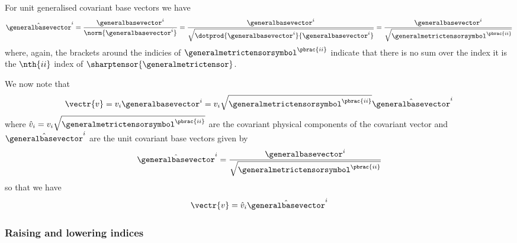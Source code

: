 For unit generalised covariant base vectors we have
\begin{equation}
  \hat{\generalbasevector}^{i}=\dfrac{\generalbasevector^{i}}{\norm{\generalbasevector^{i}}}=\dfrac{\generalbasevector^{i}}{\sqrt{\dotprod{\generalbasevector^{i}}{\generalbasevector^{i}}}}=\dfrac{\generalbasevector^{i}}{\sqrt{\generalmetrictensorsymbol^{\pbrac{ii}}}}
\end{equation}
where, again, the brackets around the indicies of $\generalmetrictensorsymbol^{\pbrac{ii}}$ indicate that there is no sum over the index \ie it is the $\nth{ii}$ index of $\sharptensor{\generalmetrictensor}$.

We now note that
\begin{equation}
  \vectr{v}=v_{i}\generalbasevector^{i}=v_{i}\sqrt{\generalmetrictensorsymbol^{\pbrac{ii}}}\hat{\generalbasevector}^{i}
\end{equation}
where
$\hat{v}_{i}=v_{i}\sqrt{\generalmetrictensorsymbol^{\pbrac{ii}}}$ are
the covariant physical components of the covariant vector and
$\hat{\generalbasevector}^{i}$ are the unit covariant base vectors
given by
\begin{equation}
  \hat{\generalbasevector}^{i}=\dfrac{\generalbasevector^{i}}{\sqrt{\generalmetrictensorsymbol^{\pbrac{ii}}}}
\end{equation}
so that we have
\begin{equation}
  \vectr{v}=\hat{v}_{i}\hat{\generalbasevector}^{i}
\end{equation}

\subsubsection{Raising and lowering indices}

